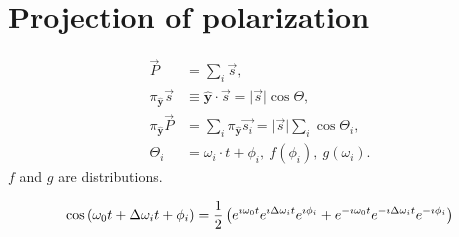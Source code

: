 \documentclass{article}
\newcommand{\uvec}[1]{\boldsymbol{\hat{#1}}}
\newcommand{\abs}[1]{\vert#1\vert}
\newcommand{\proj}[2]{\pi_{\uvec{#2}}\vec{#1}}
\newcommand{\Dw}{\Delta\omega}
\newcommand{\ii}{\imath}
\begin{document}
\section{Projection of polarization}
\begin{align*}
	\vec{P} &= \sum_i \vec{s}, \\
	\proj{s}{y} &\equiv \uvec{y}\cdot\vec{s} = \abs{\vec{s}}\cos\Theta, \\
	\proj{P}{y} &= \sum_i \proj{s_i}{y} = \abs{\vec{s}}\sum_i \cos\Theta_i, \\
	\Theta_i &= \omega_i\cdot t + \phi_i,~ f(\phi_i),~g(\omega_i).
\end{align*}
$f$ and $g$ are distributions.

\[
	\cos\bkt{\omega_0t + \Dw_it + \phi_i} = \frac12\bkt{e^{\ii\omega_0t}e^{\ii\Dw_it}e^{\ii\phi_i} + e^{-\ii\omega_0t}e^{-\ii\Dw_it}e^{-\ii\phi_i}}
\]
\end{document}
